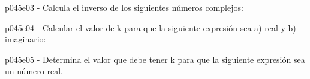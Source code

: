\documentclass[spanish, 11pt]{exam}
\begin{document}
\begin{questions}
\begin{multicols}{2}
\begin{parts}
        \end{parts}
        \end{multicols}
        \question p045e03 - Calcula el inverso de los siguientes números complejos:
        \begin{multicols}{2} 
        \end{multicols}
        \question p045e04 - Calcular el valor de k para que la siguiente expresión sea a) real y b) imaginario:
        \begin{multicols}{2} 
        \end{multicols}
        \question p045e05 - Determina el valor que debe tener k para que la siguiente expresión sea un número real.
        \begin{multicols}{2} 
\end{multicols}
\end{questions}
\end{document}
